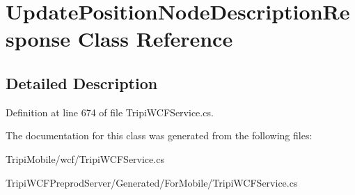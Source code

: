 \hypertarget{class_update_position_node_description_response}{
\section{UpdatePositionNodeDescriptionResponse Class Reference}
\label{class_update_position_node_description_response}
}


\subsection{Detailed Description}


Definition at line 674 of file TripiWCFService.cs.

The documentation for this class was generated from the following files:\begin{DoxyCompactItemize}
\item 
TripiMobile/wcf/TripiWCFService.cs\item 
TripiWCFPreprodServer/Generated/ForMobile/TripiWCFService.cs\end{DoxyCompactItemize}
